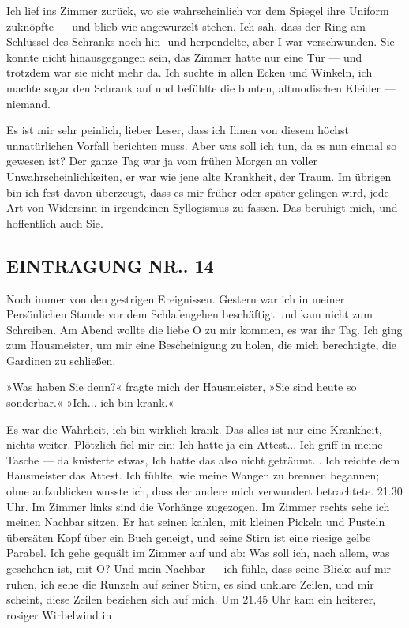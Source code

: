 Ich lief ins Zimmer zurück, wo sie wahrscheinlich vor dem Spiegel
ihre Uniform zuknöpfte — und blieb wie angewurzelt stehen. Ich sah,
dass der Ring am Schlüssel des Schranks noch hin- und herpendelte,
aber I war verschwunden. Sie konnte nicht hinausgegangen sein, das
Zimmer hatte nur eine Tür — und trotzdem war sie nicht mehr da. Ich
suchte in allen Ecken und Winkeln, ich machte sogar den Schrank auf
und befühlte die bunten, altmodischen Kleider — niemand.

Es ist mir sehr peinlich, lieber Leser, dass ich Ihnen von diesem
höchst unnatürlichen Vorfall berichten muss. Aber was soll ich tun,
da es nun einmal so gewesen ist? Der ganze Tag war ja vom frühen
Morgen an voller Unwahrscheinlichkeiten, er war wie jene alte
Krankheit, der Traum. Im übrigen bin ich fest davon überzeugt, dass
es mir früher oder später gelingen wird, jede Art von Widersinn in
irgendeinen Syllogismus zu fassen. Das beruhigt mich, und
hoffentlich auch Sie.

\subsection{EINTRAGUNG NR.. 14}

Noch immer von den gestrigen Ereignissen. Gestern war ich in meiner
Persönlichen Stunde vor dem Schlafengehen beschäftigt und kam nicht
zum Schreiben. Am Abend wollte die liebe O zu mir kommen, es war
ihr Tag. Ich ging zum Hausmeister, um mir eine Bescheinigung zu
holen, die mich berechtigte, die Gardinen zu schließen.

»Was haben Sie denn?« fragte mich der Hausmeister, »Sie sind heute
so sonderbar.« »Ich... ich bin krank.«

Es war die Wahrheit, ich bin wirklich krank. Das alles ist nur eine
Krankheit, nichts weiter. Plötzlich fiel mir ein: Ich hatte ja ein
Attest... Ich griff in meine Tasche — da knisterte etwas, Ich hatte
das also nicht geträumt... Ich reichte dem Hausmeister das Attest.
Ich fühlte, wie meine Wangen zu brennen begannen; ohne aufzublicken
wusste ich, dass der andere mich verwundert betrachtete. 21.30 Uhr.
Im Zimmer links sind die Vorhänge zugezogen. Im Zimmer rechts sehe
ich meinen Nachbar sitzen. Er hat seinen kahlen, mit kleinen
Pickeln und Pusteln übersäten Kopf über ein Buch geneigt, und seine
Stirn ist eine riesige gelbe Parabel. Ich gehe gequält im Zimmer
auf und ab: Was soll ich, nach allem, was geschehen ist, mit O? Und
mein Nachbar — ich fühle, dass seine Blicke auf mir ruhen, ich sehe
die Runzeln auf seiner Stirn, es sind unklare Zeilen, und mir
scheint, diese Zeilen beziehen sich auf mich. Um 21.45 Uhr kam ein
heiterer, rosiger Wirbelwind in

